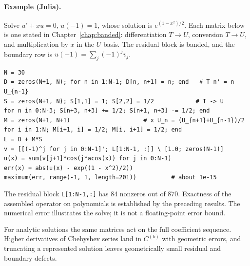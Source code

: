 \paragraph{Example (Julia).} Solve $u'+xu=0$, $u(-1)=1$, whose solution is
$e^{(1-x^2)/2}$. Each matrix below is one stated in Chapter~\ref{chap:banded}:
differentiation $T\to U$, conversion $T\to U$, and multiplication by $x$ in the
$U$ basis. The residual block is banded, and the boundary row is
$u(-1)=\sum_j(-1)^jv_j$.
\begin{verbatim}
N = 30
D = zeros(N+1, N); for n in 1:N-1; D[n, n+1] = n; end   # T_n' = n U_{n-1}
S = zeros(N+1, N); S[1,1] = 1; S[2,2] = 1/2            # T -> U
for n in 0:N-3; S[n+3, n+3] += 1/2; S[n+1, n+3] -= 1/2; end
M = zeros(N+1, N+1)                     # x U_n = (U_{n+1}+U_{n-1})/2
for i in 1:N; M[i+1, i] = 1/2; M[i, i+1] = 1/2; end
L = D + M*S
v = [[(-1)^j for j in 0:N-1]'; L[1:N-1, :]] \ [1.0; zeros(N-1)]
u(x) = sum(v[j+1]*cos(j*acos(x)) for j in 0:N-1)
err(x) = abs(u(x) - exp((1 - x^2)/2))
maximum(err, range(-1, 1, length=201))          # about 1e-15
\end{verbatim}
The residual block \texttt{L[1:N-1,:]} has 84 nonzeros out of 870. Exactness of
the assembled operator on polynomials is established by the preceding results.
The numerical error illustrates the solve; it is not a floating-point error bound.

For analytic solutions the same matrices act on the full coefficient sequence.
Higher derivatives of Chebyshev series land in $C^{(k)}$ with geometric errors,
and truncating a represented solution leaves geometrically small residual and
boundary defects.

